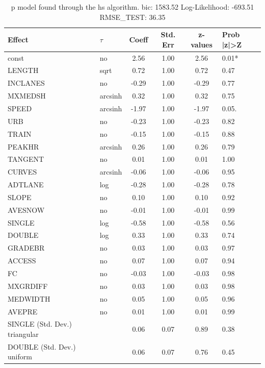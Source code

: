 \begin{table}
	\caption{p model found through the hs algorithm. bic: 1583.52 Log-Likelihood: -693.51 RMSE_TEST: 36.35}
	\begin{center}
		\begin{tabular}{|l|l|c|c|c|l|}
			\hline
			Effect & $\tau$ & Coeff & Std. Err & z-values & Prob |z|>Z \\
			\hline
			const & no & 2.56 & 1.00 & 2.56 & 0.01* \\
			\hline
			LENGTH & sqrt & 0.72 & 1.00 & 0.72 & 0.47 \\
			\hline
			INCLANES & no & -0.29 & 1.00 & -0.29 & 0.77 \\
			\hline
			MXMEDSH & arcsinh & 0.32 & 1.00 & 0.32 & 0.75 \\
			\hline
			SPEED & arcsinh & -1.97 & 1.00 & -1.97 & 0.05. \\
			\hline
			URB & no & -0.23 & 1.00 & -0.23 & 0.82 \\
			\hline
			TRAIN & no & -0.15 & 1.00 & -0.15 & 0.88 \\
			\hline
			PEAKHR & arcsinh & 0.26 & 1.00 & 0.26 & 0.79 \\
			\hline
			TANGENT & no & 0.01 & 1.00 & 0.01 & 1.00 \\
			\hline
			CURVES & arcsinh & -0.06 & 1.00 & -0.06 & 0.95 \\
			\hline
			ADTLANE & log & -0.28 & 1.00 & -0.28 & 0.78 \\
			\hline
			SLOPE & no & 0.10 & 1.00 & 0.10 & 0.92 \\
			\hline
			AVESNOW & no & -0.01 & 1.00 & -0.01 & 0.99 \\
			\hline
			SINGLE & log & -0.58 & 1.00 & -0.58 & 0.56 \\
			\hline
			DOUBLE & log & 0.33 & 1.00 & 0.33 & 0.74 \\
			\hline
			GRADEBR & no & 0.03 & 1.00 & 0.03 & 0.97 \\
			\hline
			ACCESS & no & 0.07 & 1.00 & 0.07 & 0.94 \\
			\hline
			FC & no & -0.03 & 1.00 & -0.03 & 0.98 \\
			\hline
			MXGRDIFF & no & 0.03 & 1.00 & 0.03 & 0.98 \\
			\hline
			MEDWIDTH & no & 0.05 & 1.00 & 0.05 & 0.96 \\
			\hline
			AVEPRE & no & 0.01 & 1.00 & 0.01 & 0.99 \\
			\hline
			SINGLE (Std. Dev.) triangular &  & 0.06 & 0.07 & 0.89 & 0.38 \\
			\hline
			DOUBLE (Std. Dev.) uniform &  & 0.06 & 0.07 & 0.76 & 0.45 \\

\end{tabular}
\end{center}
\end{table}
